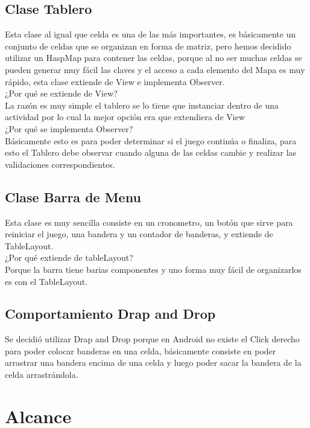 \documentclass[11pt]{article} %
\begin{document}
\subsection{Clase Tablero}
Esta clase al igual que celda es una de las más importantes, es básicamente un conjunto de celdas que se organizan en forma de matriz, pero hemos decidido utilizar un HaspMap para contener las celdas, porque al no ser muchas celdas se pueden generar muy fácil las claves y el acceso a cada elemento del Mapa es muy rápido, esta clase extiende de View e implementa Observer.\\
¿Por qué se extiende de View?\\
La razón es muy simple el tablero se lo tiene que instanciar dentro de una actividad por lo cual la mejor opción era que extendiera de View\\
¿Por qué se implementa Observer?\\
Básicamente esto es para poder determinar si el juego continúa o finaliza, para esto el Tablero debe observar cuando alguna de las celdas cambie y realizar las validaciones correspondientes.\\

\subsection{Clase Barra de Menu}
Esta clase es muy sencilla consiste en un cronometro, un botón que sirve para reiniciar el juego, una bandera y un contador de banderas, y extiende de TableLayout.\\
¿Por qué extiende de tableLayout?\\
Porque la barra tiene barias componentes y uno forma muy fácil de organizarlos es con el TableLayout.\\

\subsection{Comportamiento Drap and Drop}
Se decidió utilizar Drap and Drop porque en Android no existe el Click derecho para poder colocar banderas en una celda, básicamente consiste en poder arrastrar una bandera encima de una celda y luego poder sacar la bandera de la celda arrastrándola.





\section{Alcance}
\end{document}

